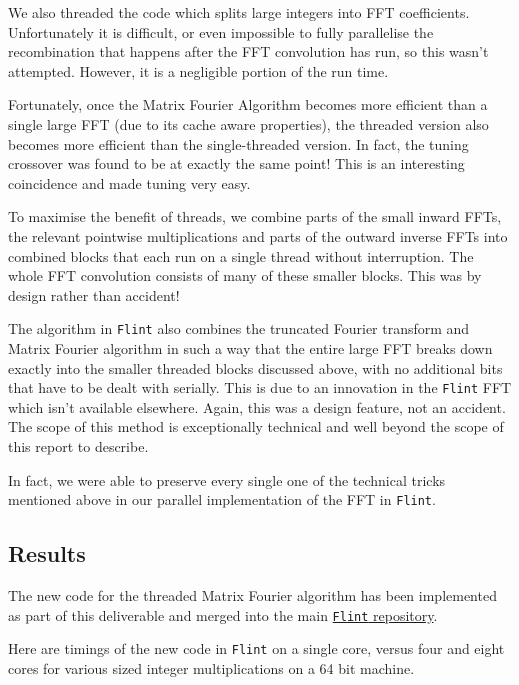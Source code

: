 We also threaded the code which splits large integers into FFT
coefficients. Unfortunately it is difficult, or even impossible to fully
parallelise the recombination that happens after the FFT convolution has
run, so this wasn't attempted. However, it is a negligible portion of
the run time.

Fortunately, once the Matrix Fourier Algorithm becomes more efficient
than a single large FFT (due to its cache aware properties), the
threaded version also becomes more efficient than the single-threaded
version. In fact, the tuning crossover was found to be at exactly the
same point! This is an interesting coincidence and made tuning very
easy.

To maximise the benefit of threads, we combine parts of the small inward
FFTs, the relevant pointwise multiplications and parts of the outward
inverse FFTs into combined blocks that each run on a single thread
without interruption. The whole FFT convolution consists of many of
these smaller blocks. This was by design rather than accident!

The algorithm in \texttt{Flint} also combines the truncated Fourier
transform and Matrix Fourier algorithm in such a way that the entire
large FFT breaks down exactly into the smaller threaded blocks discussed
above, with no additional bits that have to be dealt with serially. This
is due to an innovation in the \texttt{Flint} FFT which isn't available
elsewhere. Again, this was a design feature, not an accident. The scope
of this method is exceptionally technical and well beyond the scope of
this report to describe.

In fact, we were able to preserve every single one of the technical
tricks mentioned above in our parallel implementation of the FFT in
\texttt{Flint}.

\subsection{Results}\label{results}

The new code for the threaded Matrix Fourier algorithm has been
implemented as part of this deliverable and merged into the main
\href{https://github.com/wbhart/flint2/tree/trunk/fft}{\texttt{Flint}
repository}.

Here are timings of the new code in \texttt{Flint} on a single core,
versus four and eight cores for various sized integer multiplications on
a 64 bit machine.


